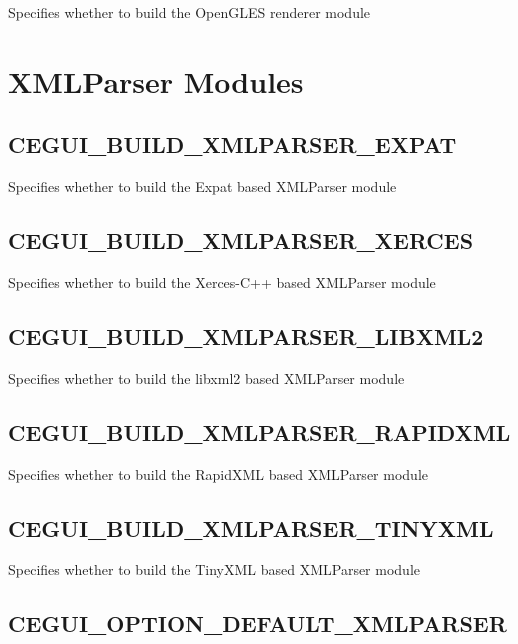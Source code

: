 Specifies whether to build the Open\+G\+L\+ES renderer module\hypertarget{build_options_build_options_xml_parsers}{}\section{X\+M\+L\+Parser Modules}\label{build_options_build_options_xml_parsers}
\hypertarget{build_options_build_options_expat_parser}{}\subsection{C\+E\+G\+U\+I\+\_\+\+B\+U\+I\+L\+D\+\_\+\+X\+M\+L\+P\+A\+R\+S\+E\+R\+\_\+\+E\+X\+P\+AT}\label{build_options_build_options_expat_parser}
Specifies whether to build the Expat based X\+M\+L\+Parser module \hypertarget{build_options_build_options_xerces_parser}{}\subsection{C\+E\+G\+U\+I\+\_\+\+B\+U\+I\+L\+D\+\_\+\+X\+M\+L\+P\+A\+R\+S\+E\+R\+\_\+\+X\+E\+R\+C\+ES}\label{build_options_build_options_xerces_parser}
Specifies whether to build the Xerces-\/\+C++ based X\+M\+L\+Parser module \hypertarget{build_options_build_options_libxml_parser}{}\subsection{C\+E\+G\+U\+I\+\_\+\+B\+U\+I\+L\+D\+\_\+\+X\+M\+L\+P\+A\+R\+S\+E\+R\+\_\+\+L\+I\+B\+X\+M\+L2}\label{build_options_build_options_libxml_parser}
Specifies whether to build the libxml2 based X\+M\+L\+Parser module \hypertarget{build_options_build_options_rapidxml_parser}{}\subsection{C\+E\+G\+U\+I\+\_\+\+B\+U\+I\+L\+D\+\_\+\+X\+M\+L\+P\+A\+R\+S\+E\+R\+\_\+\+R\+A\+P\+I\+D\+X\+ML}\label{build_options_build_options_rapidxml_parser}
Specifies whether to build the Rapid\+X\+ML based X\+M\+L\+Parser module \hypertarget{build_options_build_options_tinyxml_parser}{}\subsection{C\+E\+G\+U\+I\+\_\+\+B\+U\+I\+L\+D\+\_\+\+X\+M\+L\+P\+A\+R\+S\+E\+R\+\_\+\+T\+I\+N\+Y\+X\+ML}\label{build_options_build_options_tinyxml_parser}
Specifies whether to build the Tiny\+X\+ML based X\+M\+L\+Parser module \hypertarget{build_options_build_options_default_parser}{}\subsection{C\+E\+G\+U\+I\+\_\+\+O\+P\+T\+I\+O\+N\+\_\+\+D\+E\+F\+A\+U\+L\+T\+\_\+\+X\+M\+L\+P\+A\+R\+S\+ER}\label{build_options_build_options_default_parser}
